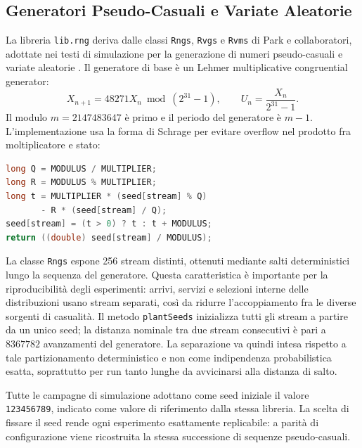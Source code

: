 ﻿\documentclass[a4paper,12pt]{article}
\begin{document}
\subsection{Generatori Pseudo-Casuali e Variate Aleatorie}
La libreria \texttt{lib.rng} deriva dalle classi \texttt{Rngs}, \texttt{Rvgs} e \texttt{Rvms} di Park e collaboratori, adottate nei testi di simulazione per la generazione di numeri pseudo-casuali e variate aleatorie \cite{leemis-park-book}. Il generatore di base è un Lehmer multiplicative congruential generator:
\begin{equation}
    X_{n+1} = 48271 X_n \bmod (2^{31}-1),
    \qquad
    U_n = \frac{X_n}{2^{31}-1}.
\end{equation}
Il modulo $m=2147483647$ è primo e il periodo del generatore è $m-1$. L'implementazione usa la forma di Schrage per evitare overflow nel prodotto fra moltiplicatore e stato:
\begin{lstlisting}[language=Java]
long Q = MODULUS / MULTIPLIER;
long R = MODULUS % MULTIPLIER;
long t = MULTIPLIER * (seed[stream] % Q)
       - R * (seed[stream] / Q);
seed[stream] = (t > 0) ? t : t + MODULUS;
return ((double) seed[stream] / MODULUS);
\end{lstlisting}

La classe \texttt{Rngs} espone 256 stream distinti, ottenuti mediante salti deterministici lungo la sequenza del generatore. Questa caratteristica è importante per la riproducibilità degli esperimenti: arrivi, servizi e selezioni interne delle distribuzioni usano stream separati, così da ridurre l'accoppiamento fra le diverse sorgenti di casualità. Il metodo \texttt{plantSeeds} inizializza tutti gli stream a partire da un unico seed; la distanza nominale tra due stream consecutivi è pari a $8367782$ avanzamenti del generatore. La separazione va quindi intesa rispetto a tale partizionamento deterministico e non come indipendenza probabilistica esatta, soprattutto per run tanto lunghe da avvicinarsi alla distanza di salto.

Tutte le campagne di simulazione adottano come seed iniziale il valore \texttt{123456789}, indicato come valore di riferimento dalla stessa libreria. La scelta di fissare il seed rende ogni esperimento esattamente replicabile: a parità di configurazione viene ricostruita la stessa successione di sequenze pseudo-casuali.
\end{document}
